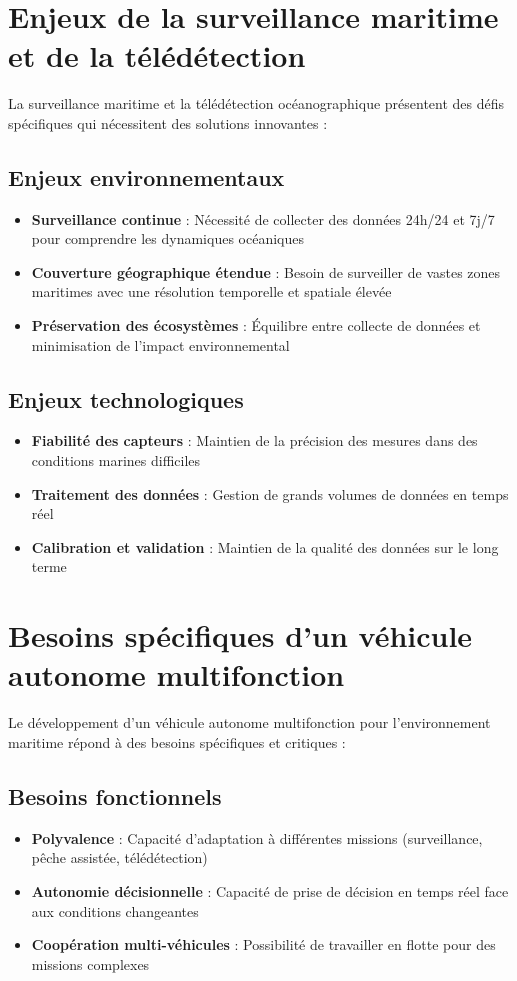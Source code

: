 {\section{Enjeux de la surveillance maritime et de la télédétection}
La surveillance maritime et la télédétection océanographique présentent des défis spécifiques qui nécessitent des solutions innovantes :

\subsection{Enjeux environnementaux}
\begin{itemize}
    \item \textbf{Surveillance continue} : Nécessité de collecter des données 24h/24 et 7j/7 pour comprendre les dynamiques océaniques
    \item \textbf{Couverture géographique étendue} : Besoin de surveiller de vastes zones maritimes avec une résolution temporelle et spatiale élevée
    \item \textbf{Préservation des écosystèmes} : Équilibre entre collecte de données et minimisation de l'impact environnemental
\end{itemize}

\subsection{Enjeux technologiques}
\begin{itemize}
    \item \textbf{Fiabilité des capteurs} : Maintien de la précision des mesures dans des conditions marines difficiles
    \item \textbf{Traitement des données} : Gestion de grands volumes de données en temps réel
    \item \textbf{Calibration et \gls{validation}} : Maintien de la qualité des données sur le long terme
\end{itemize}

\section{Besoins spécifiques d'un véhicule autonome multifonction}
Le développement d'un véhicule autonome multifonction pour l'environnement maritime répond à des besoins spécifiques et critiques :

\subsection{Besoins fonctionnels}
\begin{itemize}
    \item \textbf{Polyvalence} : Capacité d'adaptation à différentes missions (surveillance, pêche assistée, télédétection)
    \item \textbf{Autonomie décisionnelle} : Capacité de prise de décision en temps réel face aux conditions changeantes
    \item \textbf{Coopération multi-véhicules} : Possibilité de travailler en flotte pour des missions complexes
\end{itemize}

}
